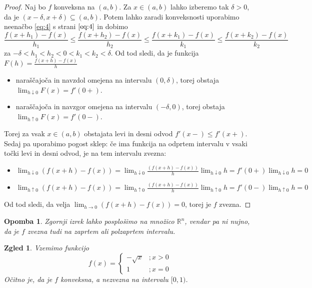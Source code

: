 \documentclass[10pt, a4paper]{article}
\newtheorem*{opomba}{Opomba}
\newtheorem{zgled}[izr]{Zgled}
\newenvironment{noticeC}{%
  \tcolorbox[%
  notitle,
  empty,
  enhanced,  %
  breakable,
  coltext=black, 
  fontupper=\rmfamily,
  noparskip,
  sharp corners,
  boxrule=-1pt,  %
  frame hidden,
  left=7pt,  %
  right=7pt,
  top=5pt,
  bottom=5pt,
  before skip=2.5ex plus 2pt,
  after skip=2.5ex plus 2pt,
  overlay unbroken and last={%
  },
  ]}
{\endtcolorbox}
\newenvironment{dokaz}%
  {\begin{noticeC}\begin{proof}}%
  {\end{proof}\end{noticeC}}
\newcommand{\R}{\mathbb {R}}
\newcommand{\limf}[3]{\lim_{#1 \to #2} {#3}}
\newcommand{\rlimf}[3]{\lim_{#1 \downarrow #2} {#3}}
\newcommand{\llimf}[3]{\lim_{#1 \uparrow #2} {#3}}
\begin{document}
\begin{dokaz}
    Naj bo $f$ konveksna na $(a, b)$.
    Za $x \in (a, b)$ lahko izberemo tak $\delta > 0$, da je $(x - \delta, x + \delta) \subseteq (a, b)$.
    Potem lahko zaradi konveksnosti uporabimo neenačbo \eqref{eq:4} s strani $\pageref{eq:4}$ in dobimo
    $$\frac{f(x+h_1) - f(x)}{h_1} \le\frac{f(x+h_2) - f(x)}{h_2} \le \frac{f(x+k_1) - f(x)}{k_1} \le \frac{f(x+k_2) - f(x)}{k_2}$$
    za $- \delta < h_1 < h_2 < 0 < k_1 < k_2 < \delta.$
    Od tod sledi, da je funkcija $F(h) = \frac{f(x+h) - f(x)}{h}$
    \begin{itemize}
        \item naraščajoča in navzdol omejena na intervalu $(0, \delta)$, torej obstaja $\rlimf{h}{0}{F(x)} = f'(0+)$.
        \item naraščajoča in navzgor omejena na intervalu $(-\delta, 0)$, torej obstaja $\llimf{h}{0}{F(x)} = f'(0-)$.
    \end{itemize}
    Torej za vsak $x \in (a,b)$ obstajata levi in desni odvod $f'(x-) \leq f'(x+)$.
    Sedaj pa uporabimo pogost sklep: če ima funkcija na odprtem intervalu v vsaki točki levi in desni odvod, je na tem intervalu zvezna:
    \begin{itemize}
        \item $\displaystyle \rlimf{h}{0}{(f(x+h) - f(x))} = \rlimf{h}{0}{\frac{(f(x+h) - f(x))}{h} \rlimf{h}{0}{h}} = f'(0+) \rlimf{h}{0}{h} = 0$
        \item $\displaystyle \llimf{h}{0}{(f(x+h) - f(x))} = \llimf{h}{0}{\frac{(f(x+h) - f(x))}{h} \llimf{h}{0}{h}} = f'(0-) \llimf{h}{0}{h} = 0$
    \end{itemize}
    Od tod sledi, da velja $\limf{h}{0}{(f(x+h) - f(x))} = 0$, torej je $f$ zvezna.
\end{dokaz}

\begin{opomba}
    Zgornji izrek lahko posplošimo na množico $\R^n$, vendar pa ni nujno, da je $f$ zvezna tudi na zaprtem ali polzaprtem intervalu.
\end{opomba}

\begin{zgled}
    Vzemimo funkcijo 
    $$f(x) = \begin{cases}
        -\sqrt{x} &; x > 0\\
        1 &; x = 0
    \end{cases}$$
    Očitno je, da je $f$ konveksna, a nezvezna na intervalu $[0,1)$.
\end{zgled}
\end{document}
